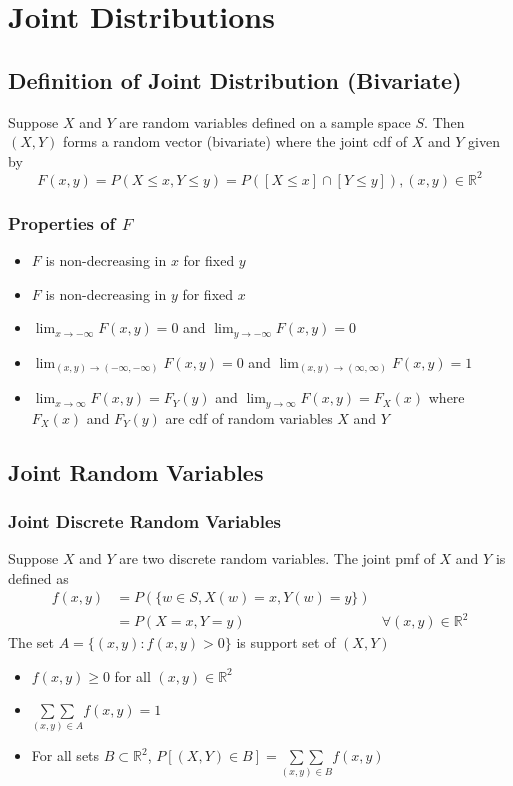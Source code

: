 \documentclass[11pt]{article}
\newcommand{\R}{{\mathbb{R}}}
\begin{document}
\section{Joint Distributions}
\subsection{Definition of Joint Distribution (Bivariate)}
Suppose $X$ and $Y$ are random variables defined on a sample space $S$. Then $(X,Y)$ forms a random vector (bivariate)
where the joint cdf of $X$ and $Y$ given by 
\[F(x,y)=P(X\leq x, Y\leq y)=P([X\leq x]\cap[Y\leq y]), (x,y)\in\R^2\]
\subsubsection{Properties of $F$} 
\begin{itemize}
    \item $F$ is non-decreasing in $x$ for fixed $y$
    \item $F$ is non-decreasing in $y$ for fixed $x$
    \item $\lim_{x\to-\infty}F(x,y)=0$ and $\lim_{y\to-\infty}F(x,y)=0$
    \item $\lim_{(x,y)\to(-\infty,-\infty)}F(x,y)=0$ and $\lim_{(x,y)\to(\infty,\infty)}F(x,y)=1$
    \item $\lim_{x\to\infty}F(x,y)=F_Y(y)$ and $\lim_{y\to\infty}F(x,y)=F_X(x)$ where $F_X(x)$ and $F_Y(y)$ are cdf of random variables $X$ and $Y$
\end{itemize}
\subsection{Joint Random Variables}
\subsubsection{Joint Discrete Random Variables}
Suppose $X$ and $Y$ are two discrete random variables. The joint pmf of $X$ and $Y$ is defined as
\begin{align*}
    f(x,y) &= P(\{w\in S, X(w)=x,Y(w)=y\}) \\
           &= P(X=x,Y=y) &\forall(x,y)\in\R^2
\end{align*}
The set $A=\{(x,y):f(x,y)>0\}$ is support set of $(X,Y)$
\begin{itemize}
    \item $f(x,y)\geq0$ for all $(x,y)\in\R^2$
    \item $\underset{(x,y)\in A}{\sum\sum} f(x,y)=1$
    \item For all sets $B\subset\R^2$, $P[(X,Y)\in B]=\underset{(x,y)\in B}{\sum\sum}f(x,y)$
\end{itemize}
\end{document}
